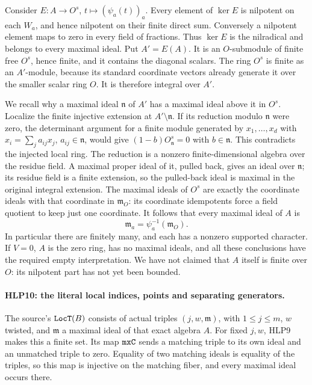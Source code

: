 Consider \(E:A\to O^s\), \(t\mapsto(\psi_a(t))_a\).
Every element of \(\ker E\) is nilpotent on each \(W_a\), and
hence nilpotent on their finite direct sum. Conversely a nilpotent
element maps to zero in every field of fractions. Thus \(\ker E\)
is the nilradical and belongs to every maximal ideal. Put
\(A'=E(A)\). It is an \(O\)-submodule of finite free \(O^s\), hence
finite, and it contains the diagonal scalars. The ring \(O^s\) is
finite as an \(A'\)-module, because its standard coordinate vectors
already generate it over the smaller scalar ring \(O\). It is
therefore integral over \(A'\).

We recall why a maximal ideal \(\mathfrak n\) of \(A'\) has a
maximal ideal above it in \(O^s\). Localize the finite injective
extension at \(A'\setminus\mathfrak n\). If its reduction modulo
\(\mathfrak n\) were zero, the determinant argument for a finite
module generated by \(x_1,\ldots,x_d\) with
\(x_i=\sum_j a_{ij}x_j\), \(a_{ij}\in\mathfrak n\), would give
\((1-b)O^s_{\mathfrak n}=0\) with \(b\in\mathfrak n\).
This contradicts the injected local ring. The reduction is a
nonzero finite-dimensional algebra over the residue field. A
maximal proper ideal of it, pulled back, gives an ideal over
\(\mathfrak n\); its residue field is a finite extension, so the
pulled-back ideal is maximal in the original integral extension.
The maximal ideals of \(O^s\) are exactly the coordinate ideals
with that coordinate in \(\mathfrak m_O\): its coordinate
idempotents force a field quotient to keep just one coordinate.
It follows that every maximal ideal of \(A\) is
\[
              \mathfrak m_a=\psi_a^{-1}(\mathfrak m_O). \tag{HLP.8}
\]
In particular there are finitely many, and each has a nonzero
supported character. If \(V=0\), \(A\) is the zero ring, has no
maximal ideals, and all these conclusions have the required empty
interpretation. We have not claimed that \(A\) itself is finite
over \(O\): its nilpotent part has not yet been bounded.

\paragraph{HLP10: the literal local indices, points and separating generators.}
\label{claim:HLP10}
The source's \(\texttt{Loc\allowbreak T}(B)\) consists of actual triples
\((j,w,\mathfrak m)\), with \(1\le j\le m\), \(w\) twisted,
and \(\mathfrak m\) a maximal ideal of that exact algebra \(A\).
For fixed \(j,w\), HLP9 makes this a finite set. Its map
\(\texttt{mx\allowbreak C}\) sends a matching triple to its own ideal and
an unmatched triple to zero. Equality of two matching ideals is
equality of the triples, so this map is injective on the matching
fiber, and every maximal ideal occurs there.

